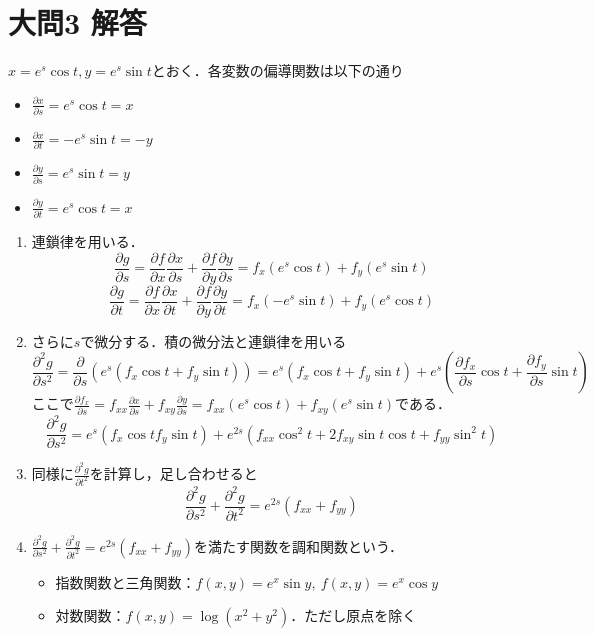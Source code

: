 \documentclass[dvipdfmx]{jsreport}
\begin{document}
\section{大問3 解答}
\begin{souanswer} %
	$x= e^s\cos{t}, y= e^s\sin{t}$とおく．各変数の偏導関数は以下の通り
\begin{itemize}
	\item $\frac{\partial x}{\partial s}= e^s\cos{t}= x$
	\item $\frac{\partial x}{\partial t}= -e^s\sin{t}= -y$
	\item $\frac{\partial y}{\partial s}= e^s\sin{t}= y$
	\item $\frac{\partial y}{\partial t}= e^s\cos{t}= x$
\end{itemize}
\begin{enumerate}
	\item 連鎖律を用いる．
\begin{equation*}
	\frac{\partial g}{\partial s}= \frac{\partial f}{\partial x}\frac{\partial x}{\partial s}+ \frac{\partial f}{\partial y}\frac{\partial y}{\partial s}= f_x(e^s\cos{t})+ f_y(e^s\sin{t})
\end{equation*}
\begin{equation*}
	\frac{\partial g}{\partial t}= \frac{\partial f}{\partial x}\frac{\partial x}{\partial t}+ \frac{\partial f}{\partial y}\frac{\partial y}{\partial t}= f_x(-e^s\sin{t})+ f_y(e^s\cos{t})
\end{equation*}
	\item さらに$s$で微分する．積の微分法と連鎖律を用いる
\begin{equation*}
	\frac{\partial^2 g}{\partial s^2}= \frac{\partial}{\partial s}(e^s(f_x\cos{t}+ f_y\sin{t}))= e^s(f_x\cos{t}+ f_y\sin{t})+ e^s\left(\frac{\partial f_x}{\partial s}\cos{t}+ \frac{\partial f_y}{\partial s}\sin{t}\right)
\end{equation*}
	ここで$\frac{\partial f_x}{\partial s}= f_{xx}\frac{\partial x}{\partial s}+ f_{xy}\frac{\partial y}{\partial s}= f_{xx}(e^s\cos{t})+ f_{xy}(e^s\sin{t})$である．
\begin{equation*}
	\frac{\partial^2 g}{\partial s^2}= e^s(f_x\cos{t} f_y\sin{t})+ e^{2s}(f_{xx}\cos^2{t}+ 2f_{xy}\sin{t}\cos{t}+ f_{yy}\sin^2{t})
\end{equation*}
	\item 同様に$\frac{\partial^2 g}{\partial t^2}$を計算し，足し合わせると
\begin{equation*}
	\frac{\partial^2 g}{\partial s^2}+ \frac{\partial^2 g}{\partial t^2}= e^{2s}(f_{xx}+ f_{yy})
\end{equation*}
	\item $\frac{\partial^2 g}{\partial s^2}+ \frac{\partial^2 g}{\partial t^2}= e^{2s}(f_{xx}+ f_{yy})$を満たす関数を調和関数という．
\begin{itemize}
	\item 指数関数と三角関数：$f(x, y)= e^x\sin{y},\ f(x, y)= e^x\cos{y}$
	\item 対数関数：$f(x, y)= \log{(x^2+ y^2)}$．ただし原点を除く
\end{itemize}
\end{enumerate}
\end{souanswer}
\end{document}
